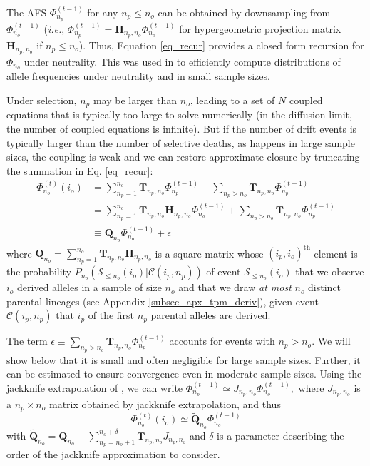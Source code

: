 \documentclass[review,nonatbib]{elsarticle}
\newcommand{\afs}[2]{\Phi_{#1}^{(#2)}}
\newcommand{\ms}{\mathcal{S}}
\newcommand{\sgcomment}[1]{{\color{red}{SG: #1}}}
\begin{document}
The AFS  $\afs{n_p}{t-1}$ for any  $n_p\leq n_o$ can be obtained by downsampling from $\afs{n_o}{t-1}$ (\textit{i.e.}, $\afs{n_p}{t-1} =
\mathbf{H}_{n_p,n_o} \afs{n_o}{t-1}$ for hypergeometric projection matrix $\mathbf{H}_{n_p,n_o}$ if
$n_p\leq n_o$). Thus, Equation \eqref{eq_recur} provides a closed form recursion for $\Phi_{n_o}$ under neutrality. 
This was used in \cite{JouganousEtAl2017} to efficiently 
compute distributions of allele frequencies under neutrality and in small sample sizes.

Under selection, $n_{p}$ may be larger than $n_o$, leading to a set of $N$ coupled equations that is
typically too large to solve numerically (in the diffusion limit, the number of coupled equations is
infinite). But if the number of drift events is typically larger than the number of selective
deaths, as happens in large sample sizes, the coupling is weak and we can restore approximate
closure by truncating the summation in Eq. \ref{eq_recur}:
\begin{equation}
\begin{split}
  \afs{n_o}{t}(i_o)
  &= \sum_{n_p=1}^{n_{o}} \mathbf{T}_{n_p,n_o}  \afs{n_p}{t-1}+ \sum_{n_p> n_o }  \mathbf{T}_{n_p,n_o} \afs{n_p}{t-1} \\
  &=      \sum_{n_p=1}^{n_{o}} \mathbf{T}_{n_p,n_o} \mathbf{H}_{n_p,n_o} \afs{n_o}{t-1}+ \sum_{n_p> n_o }  \mathbf{T}_{n_p,n_o} \afs{n_p}{t-1} \\
  &\equiv \mathbf{Q}_{n_o}                                               \afs{n_o}{t-1}+ \epsilon
\end{split}
\label{eq_truncated}
\end{equation}
where $\mathbf{Q}_{n_o} =  \sum_{n_p=1}^{n_{o}} \mathbf{T}_{n_p,n_o} \mathbf{H}_{n_p,n_o}$ is a
square matrix whose $(i_p,i_o)^\text{th}$ element is the probability $P_{n_o}(\mathcal{S}_{\leq n_o}
(i_o)| \mathcal{C}(i_p,n_p))$ of event $\ms_{\leq n_o}(i_o)$ that we observe $i_o$ derived alleles
in a sample of size $n_o$ and that we draw \emph{at most} $n_o$ distinct parental lineages (see
Appendix \ref{subsec_apx_tpm_deriv}), given event $\mathcal{C}(i_p,n_p)$ that $i_p$ of the first
$n_p$ parental alleles are derived.  

The term $\epsilon \equiv \sum_{n_p> n_o }  \mathbf{T}_{n_p,n_o} \afs{n_p}{t-1} $ 
accounts for events with $n_p>n_o.$ We will show below that it is small and often 
negligible for large sample sizes. 
Further, it can be estimated to ensure convergence even in moderate sample sizes.  
Using the jackknife extrapolation of \citep{Gravel2016}, we can write  
$\afs{n_p}{t-1} \simeq J_{n_p,n_o} \afs{n_o}{t-1},$ where $J_{n_p,n_o}$ is a $n_p\times n_o$
matrix obtained by jackknife extrapolation, and thus
\begin{equation}
  \afs{n_o}{t}(i_o) \simeq \tilde{\mathbf{Q}}_{n_o}        \afs{n_o}{t-1}                                       
\label{eq_truncated_jack}
\end{equation}
with  $ \tilde{\mathbf{Q}}_{n_o} =  \mathbf{Q}_{n_o}  +   \sum_{n_p=n_o+1 }^{n_o+\delta}  \mathbf{T}_{n_p,n_o} J_{n_p,n_o}$
and $\delta$ is a parameter describing the order of the jackknife approximation to consider. \sgcomment{There is something weird with the convention on index order here...} 
\end{document}
